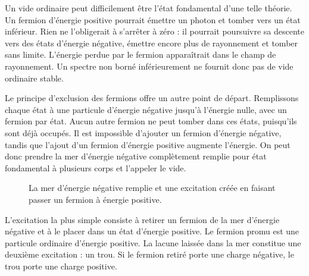Un vide ordinaire peut difficilement être l’état fondamental d’une telle théorie. Un fermion d’énergie positive pourrait émettre un photon et tomber vers un état inférieur. Rien ne l’obligerait à s’arrêter à zéro : il pourrait poursuivre sa descente vers des états d’énergie négative, émettre encore plus de rayonnement et tomber sans limite. L’énergie perdue par le fermion apparaîtrait dans le champ de rayonnement. Un spectre non borné inférieurement ne fournit donc pas de vide ordinaire stable.

Le principe d’exclusion des fermions offre un autre point de départ. Remplissons chaque état à une particule d’énergie négative jusqu’à l’énergie nulle, avec un fermion par état. Aucun autre fermion ne peut tomber dans ces états, puisqu’ils sont déjà occupés. Il est impossible d’ajouter un fermion d’énergie négative, tandis que l’ajout d’un fermion d’énergie positive augmente l’énergie. On peut donc prendre la mer d’énergie négative complètement remplie pour état fondamental à plusieurs corps et l’appeler le vide.

\begin{figure}
\centering
{}
\caption{La mer d’énergie négative remplie et une excitation créée en faisant passer un fermion à énergie positive.}
\end{figure}

L’excitation la plus simple consiste à retirer un fermion de la mer d’énergie négative et à le placer dans un état d’énergie positive. Le fermion promu est une particule ordinaire d’énergie positive. La lacune laissée dans la mer constitue une deuxième excitation : un trou. Si le fermion retiré porte une charge négative, le trou porte une charge positive.

